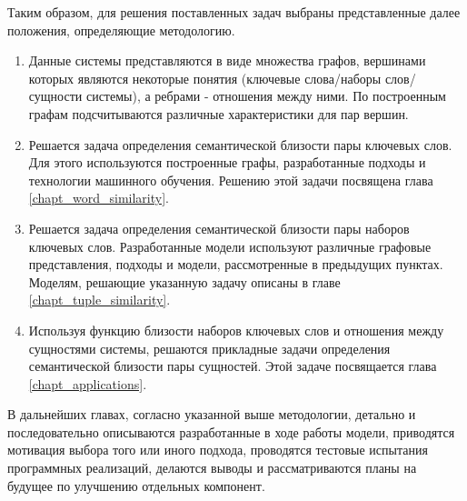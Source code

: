 
Таким образом, для решения поставленных задач выбраны представленные далее положения, определяющие методологию.

\begin{enumerate}
    \item Данные системы представляются в виде множества графов, вершинами которых являются некоторые понятия (ключевые слова/наборы слов/сущности системы), а ребрами - отношения между ними. По построенным графам подсчитываются различные характеристики для пар вершин.
    \item Решается задача определения семантической близости пары ключевых слов. Для этого используются построенные графы, разработанные подходы и технологии машинного обучения. Решению этой задачи посвящена глава \ref{chapt_word_similarity}.
    \item Решается задача определения семантической близости пары наборов ключевых слов. Разработанные модели используют различные графовые представления, подходы и модели, рассмотренные в предыдущих пунктах. Моделям, решающие указанную задачу описаны в главе \ref{chapt_tuple_similarity}.
    \item Используя функцию близости наборов ключевых слов и отношения между сущностями системы, решаются прикладные задачи определения семантической близости пары сущностей. Этой задаче посвящается глава \ref{chapt_applications}.
\end{enumerate}

В дальнейших главах, согласно указанной выше методологии, детально и последовательно описываются разработанные в ходе работы модели, приводятся мотивация выбора того или иного подхода, проводятся тестовые испытания программных реализаций, делаются выводы и рассматриваются планы на будущее по улучшению отдельных компонент.

